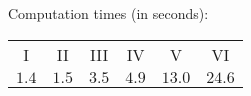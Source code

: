 Computation times (in seconds):\begin{tabular}{cccccc}I&II&III&IV&V&VI\\$ 1.4$&$ 1.5$&$ 3.5$&$ 4.9$&$13.0$&$24.6$\end{tabular}
